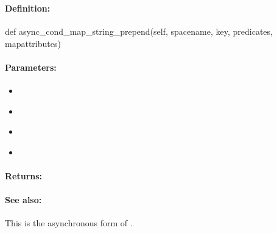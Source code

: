 \pagebreak
\subsubsection{}
\label{api:python:async_cond_map_string_prepend}


\paragraph{Definition:}
\begin{pythoncode}
def async_cond_map_string_prepend(self, spacename, key, predicates, mapattributes)
\end{pythoncode}

\paragraph{Parameters:}
\begin{itemize}[noitemsep]
\item {}\\

\item {}\\

\item {}\\

\item {}\\

\end{itemize}

\paragraph{Returns:}


\paragraph{See also:}  This is the asynchronous form of .

\pagebreak
\subsubsection{}
\label{api:python:map_string_append}


